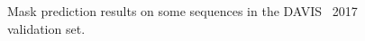 \begin{figure}[ht]
  \centering
  \caption{Mask prediction results on some sequences in the DAVIS~\davislast{} 2017 validation set. }
  \label{fig:experiments:videosegmentation:predmasksdavis}
\end{figure}
